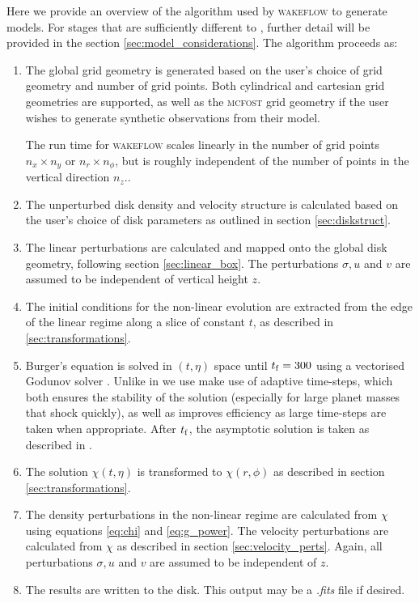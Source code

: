 Here we provide an overview of the algorithm used by \textsc{wakeflow} to generate models.
For stages that are sufficiently different to \citet{bollati2021}, further detail will be provided in the section \ref{sec:model_considerations}.
The algorithm proceeds as:
\begin{enumerate}
    \item The global grid geometry is generated based on the user's choice of grid geometry and number of grid points. Both cylindrical and cartesian grid geometries are supported, as well as the \textsc{mcfost} grid geometry if the user wishes to generate synthetic observations from their model.
    
    The run time for \textsc{wakeflow} scales linearly in the number of grid points $n_x \times n_y$ or $n_r \times n_\phi$, but is roughly independent of the number of points in the vertical direction $n_z$..
    
    \item The unperturbed disk density and velocity structure is calculated based on the user's choice of disk parameters as outlined in section \ref{sec:diskstruct}.
    
    \item The linear perturbations are calculated and mapped onto the global disk geometry, following section \ref{sec:linear_box}. The perturbations $\sigma, u$ and $v$ are assumed to be independent of vertical height $z$.
    
    \item The initial conditions for the non-linear evolution are extracted from the edge of the linear regime along a slice of constant $t$, as described in \ref{sec:transformations}.
    
    \item Burger's equation is solved in $(t,\eta)$ space until $t_{\rm f}=300$ using a vectorised Godunov solver \citep{astrofluids}. Unlike in \citet{bollati2021} we use make use of adaptive time-steps, which both ensures the stability of the solution (especially for large planet masses that shock quickly), as well as improves efficiency as large time-steps are taken when appropriate. After $t_{\rm f}$, the asymptotic solution is taken as described in \citet{bollati2021}.
    
    \item The solution $\chi(t,\eta)$ is transformed to $\chi(r,\phi)$ as described in section \ref{sec:transformations}.
    
    \item The density perturbations in the non-linear regime are calculated from $\chi$ using equations \ref{eq:chi} and \ref{eq:g_power}. The velocity perturbations are calculated from $\chi$ as described in section \ref{sec:velocity_perts}. Again, all perturbations $\sigma, u$ and $v$ are assumed to be independent of $z$.
    
    \item The results are written to the disk. This output may be a \textit{.fits} file if desired.
\end{enumerate}

